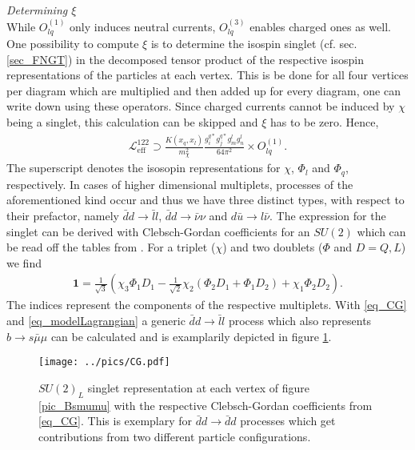 \\ \\ \textit{Determining $\xi$}\\
\noindent While $O_{lq}^{(1)}$ only induces neutral currents, $O_{lq}^{(3)}$ enables charged ones as well. One possibility to compute $\xi$ is
to determine the isospin singlet (cf. sec. \ref{sec_FNGT}) in the decomposed tensor product of the respective isospin representations of the 
particles at each vertex. This is be done for all four vertices per diagram which are multiplied and then added up for every diagram,
one can write down using these operators. Since charged currents cannot be induced by $\chi$ being a singlet, this calculation can be skipped
and $\xi$ has to be zero. Hence,
\begin{align}
  \mathcal{L}^{{122}}_\text{eff} \supset \frac{K(x_q,x_l)}{m_\chi^2}\frac{g_i^{q*} g_j^{q*} g_m^l g_n^l}{64\pi^2} \times O_{lq}^{(1)}.
 \label{eq_LagBSmumuModA}
\end{align}
The superscript denotes the isosopin representations for $\chi$, $\Phi_l$ and $\Phi_q$, respectively. In cases of higher dimensional multiplets, 
processes of the aforementioned kind occur and thus we have three distinct types, with respect 
to their prefactor, namely $\bar d d\rightarrow \bar l l$, $\bar d d \rightarrow \bar\nu \nu$ and $d \bar u\rightarrow l\bar\nu$. The expression
for the singlet can be derived with Clebsch-Gordan coefficients for an $SU(2)$ which can be read off the tables from \cite{PDG}.
For a triplet ($\chi$) and two doublets ($\Phi$ and $D=Q,L$) we find
\begin{align}
{\textbf{1}} = \frac{1}{\sqrt{3}}\left(\chi_3\Phi_1D_1 - \frac{1}{\sqrt{2}}\chi_2\left(\Phi_2D_1+\Phi_1 D_2\right) + \chi_1\Phi_2D_2 \right).
 \label{eq_CG}
\end{align}
The indices represent the components of the respective multiplets. With \eqref{eq_CG} and \eqref{eq_modelLagrangian} a generic 
$\bar d d\rightarrow \bar l l$ process which also represents $ b  \rightarrow s\bar \mu \mu$ can be calculated and is examplarily depicted in
figure \ref{pic_CG}.
\begin{figure}[t]
 \texttt{[image: ../pics/CG.pdf]}
 \caption{$SU(2)_L$ singlet representation at each vertex of figure \ref{pic_Bsmumu} with the respective Clebsch-Gordan coefficients from \eqref{eq_CG}. 
 This is exemplary for $\bar d d\rightarrow \bar d d$ processes which get contributions from two different particle configurations.}
 \label{pic_CG}
\end{figure}
